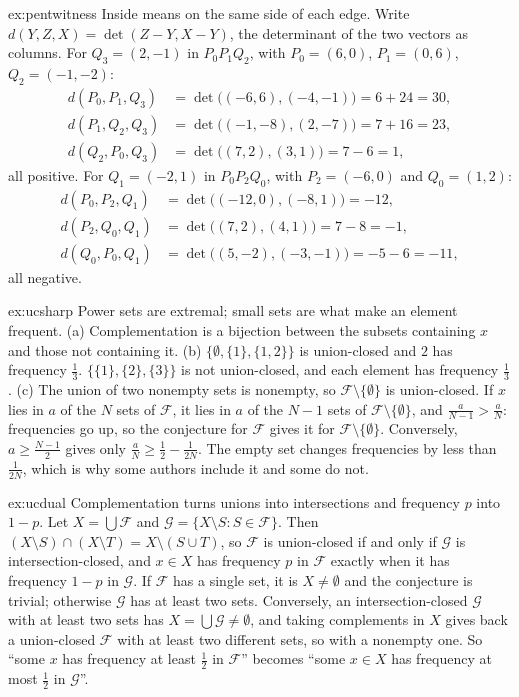 \begin{solution}{ex:pentwitness}
\idea Inside means on the same side of each edge.
\writeup Write $d(Y,Z,X)=\det(Z-Y,X-Y)$, the determinant of the two vectors as columns. For $Q_3=(2,-1)$ in $P_0P_1Q_2$, with $P_0=(6,0)$,
$P_1=(0,6)$, $Q_2=(-1,-2)$:
\[
\begin{aligned}d(P_0,P_1,Q_3)&=\det\bigl((-6,6),(-4,-1)\bigr)=6+24=30,\\ d(P_1,Q_2,Q_3)&=\det\bigl((-1,-8),(2,-7)\bigr)=7+16=23,\\
d(Q_2,P_0,Q_3)&=\det\bigl((7,2),(3,1)\bigr)=7-6=1,\end{aligned}
\]
all positive. For $Q_1=(-2,1)$ in $P_0P_2Q_0$, with $P_2=(-6,0)$ and $Q_0=(1,2)$:
\[
\begin{aligned}d(P_0,P_2,Q_1)&=\det\bigl((-12,0),(-8,1)\bigr)=-12,\\ d(P_2,Q_0,Q_1)&=\det\bigl((7,2),(4,1)\bigr)=7-8=-1,\\
d(Q_0,P_0,Q_1)&=\det\bigl((5,-2),(-3,-1)\bigr)=-5-6=-11,\end{aligned}
\]
all negative.
\end{solution}

\begin{solution}{ex:ucsharp}
\idea Power sets are extremal; small sets are what make an element frequent.
\writeup (a) Complementation is a bijection between the subsets containing $x$ and those not containing it. (b) $\{\emptyset,\{1\},\{1,2\}\}$ is
union-closed and $2$ has frequency $\frac13$. $\{\{1\},\{2\},\{3\}\}$ is not union-closed, and each element has frequency $\frac13$. (c) The union of two nonempty sets is nonempty, so $\mathcal F\setminus\{\emptyset\}$ is union-closed. If $x$ lies in $a$ of the $N$ sets
of $\mathcal F$, it lies in $a$ of the $N-1$ sets of $\mathcal F\setminus\{\emptyset\}$, and $\frac a{N-1}>\frac aN$: frequencies go up, so the
conjecture for $\mathcal F$ gives it for $\mathcal F\setminus\{\emptyset\}$. Conversely, $a\ge\frac{N-1}2$ gives only
$\frac aN\ge\frac12-\frac1{2N}$. The empty set changes frequencies by less than $\frac1{2N}$, which is why some authors include it and some do not.
\end{solution}

\begin{solution}{ex:ucdual}
\idea Complementation turns unions into intersections and frequency $p$ into $1-p$.
\writeup Let $X=\bigcup\mathcal F$ and $\mathcal G=\{X\setminus S:S\in\mathcal F\}$. Then $(X\setminus S)\cap(X\setminus T)=X\setminus(S\cup T)$, so
$\mathcal F$ is union-closed if and only if $\mathcal G$ is intersection-closed, and $x\in X$ has frequency $p$ in $\mathcal F$ exactly when it has
frequency $1-p$ in $\mathcal G$. If $\mathcal F$ has a single set, it is $X\neq\emptyset$ and the conjecture is trivial; otherwise $\mathcal G$ has
at least two sets. Conversely, an intersection-closed $\mathcal G$ with at least two sets has $X=\bigcup\mathcal G\ne\emptyset$, and taking complements
in $X$ gives back a union-closed $\mathcal F$ with at least two different sets, so with a nonempty one. So ``some $x$ has frequency at least $\frac12$
in $\mathcal F$'' becomes ``some $x\in X$ has frequency at most $\frac12$ in $\mathcal G$''.
\end{solution}

